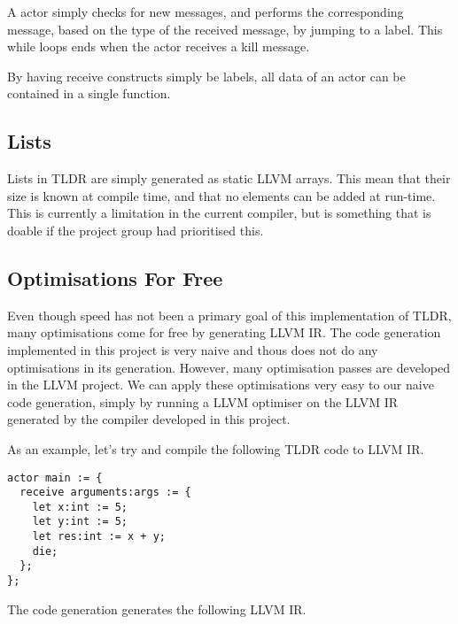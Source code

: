 A actor simply checks for new messages, and performs the corresponding message, based on the type of the received message, by jumping to a label. This while loops ends when the actor receives a kill message.

By having receive constructs simply be labels, all data of an actor can be contained in a single function.

\subsection{Lists}

Lists in TLDR are simply generated as static LLVM arrays. This mean that their size is known at compile time, and that no elements can be added at run-time. This is currently a limitation in the current compiler, but is something that is doable if the project group had prioritised this.

\subsection{Optimisations For Free}

Even though speed has not been a primary goal of this implementation of TLDR, many optimisations come for free by generating LLVM IR. The code generation implemented in this project is very naive and thous does not do any optimisations in its generation. However, many optimisation passes are developed in the LLVM project. We can apply these optimisations very easy to our naive code generation, simply by running a LLVM optimiser on the LLVM IR generated by the compiler developed in this project.

As an example, let's try and compile the following TLDR code to LLVM IR.

\begin{verbatim}
actor main := {
  receive arguments:args := {
    let x:int := 5;
    let y:int := 5;
    let res:int := x + y;
    die;
  };
};
\end{verbatim}

The code generation generates the following LLVM IR.

